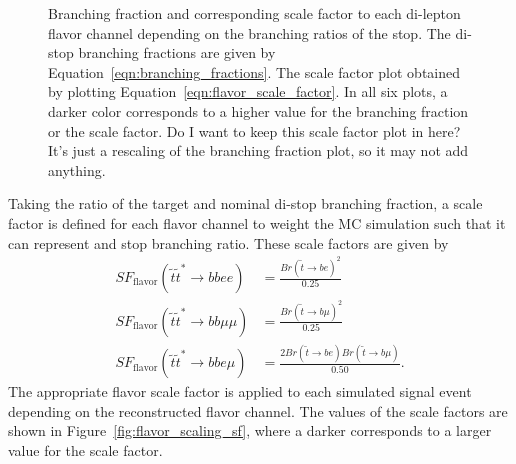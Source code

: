 \begin{figure}[ht]
  \centering
  \caption{Branching fraction and corresponding scale factor to each di-lepton
    flavor channel depending on the branching ratios of the stop.
    The di-stop branching fractions are given by
    Equation~\ref{eqn:branching_fractions}.
    The scale factor plot obtained by plotting
    Equation~\ref{eqn:flavor_scale_factor}.
    In all six plots, a darker color corresponds to a higher value for the
    branching fraction or the scale factor.
    {\color{red} Do I want to keep this scale factor plot in here? It's just a
      rescaling of the branching fraction plot, so it may not add anything.
    }
  }
  \label{fig:flavor_scaling}
\end{figure}

Taking the ratio of the target and nominal di-stop branching fraction, a
scale factor is defined for each flavor channel to weight the MC simulation
such that it can represent and stop branching ratio.
These scale factors are given by
\begin{equation}
  \label{eqn:flavor_scale_factor}
  \begin{aligned}
    SF_\mathrm{flavor}(\tilde{t}\tilde{t}^{*} \rightarrow bbee)     &=
      \frac{Br(\tilde{t} \rightarrow be)^2}{0.25} \\
    SF_\mathrm{flavor}(\tilde{t}\tilde{t}^{*} \rightarrow bb\mu\mu) &=
      \frac{Br(\tilde{t} \rightarrow b\mu)^2}{0.25} \\
    SF_\mathrm{flavor}(\tilde{t}\tilde{t}^{*} \rightarrow bbe\mu)   &=
      \frac{2Br(\tilde{t} \rightarrow be)Br(\tilde{t} \rightarrow b\mu)}{0.50}.
  \end{aligned}
\end{equation}
The appropriate flavor scale factor is applied to each simulated signal event
depending on the reconstructed flavor channel.
The values of the scale factors are shown in Figure~\ref{fig:flavor_scaling_sf},
where a darker corresponds to a larger value for the scale factor.

